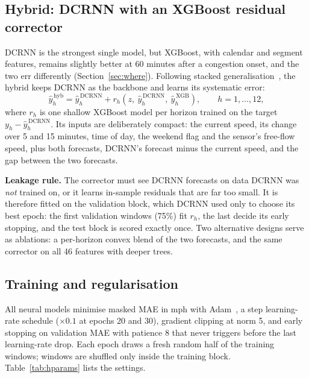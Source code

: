 \documentclass[11pt,a4paper]{article}
\begin{document}
\subsection{Hybrid: DCRNN with an XGBoost residual corrector}\label{sec:hybrid-method}
DCRNN is the strongest single model, but XGBoost, with calendar and segment features, remains slightly better at
60 minutes after a congestion onset, and the two err differently (Section~\ref{sec:where}). Following stacked
generalisation~\citep{wolpert1992stacking}, the hybrid keeps DCRNN as the backbone and learns its systematic error:
\begin{equation}
\hat y^{\,\mathrm{hyb}}_h = \hat y^{\,\mathrm{DCRNN}}_h + r_h\!\left(z,\ \hat y^{\,\mathrm{DCRNN}}_h,\ \hat y^{\,\mathrm{XGB}}_h\right),\qquad h=1,\dots,12,
\end{equation}
where $r_h$ is one shallow XGBoost model per horizon trained on the target $y_h-\hat y^{\,\mathrm{DCRNN}}_h$. Its inputs
are deliberately compact: the current speed, its change over 5 and 15 minutes, time of day, the weekend flag and the
sensor's free-flow speed, plus both forecasts, DCRNN's forecast minus the current speed, and the gap between the two
forecasts.

\textbf{Leakage rule.} The corrector must see DCRNN forecasts on data DCRNN was \emph{not} trained on, or it learns
in-sample residuals that are far too small. It is therefore fitted on the validation block, which DCRNN used only to
choose its best epoch: the first \HybFitWindows{} validation windows (75\%) fit $r_h$, the last \HybStopWindows{} decide
its early stopping, and the test block is scored exactly once. Two alternative designs serve as ablations: a per-horizon
convex blend of the two forecasts, and the same corrector on all 46 features with deeper trees.

\subsection{Training and regularisation}
All neural models minimise masked MAE in mph with Adam~\citep{kingma2015adam}, a step learning-rate schedule
($\times0.1$ at epochs 20 and 30), gradient clipping at norm 5, and early stopping on validation MAE with patience 8 that
never triggers before the last learning-rate drop. Each epoch draws a fresh random half of the training windows; windows
are shuffled only inside the training block. Table~\ref{tab:hparams} lists the settings.
\end{document}
